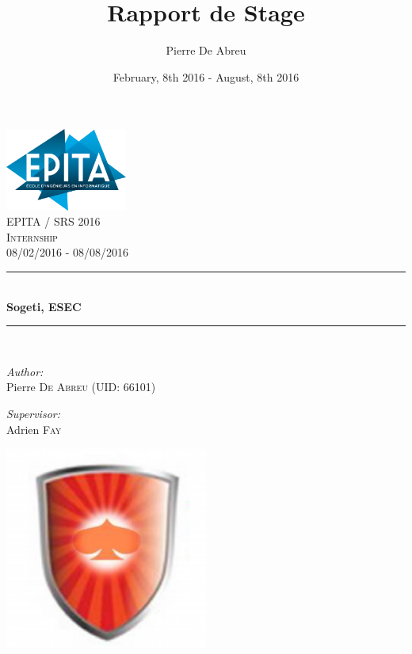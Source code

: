 \documentclass[a4paper, 12pt]{report}
\title{Rapport de Stage}
\author{Pierre De Abreu}
\date{February, 8th 2016 - August, 8th 2016}
\newcommand{\HRule}{\rule{\linewidth}{0.5mm}}
\begin{document}
\begin{titlepage}
\begin{center}

\includegraphics[width=0.3\textwidth]{images/epita.png}~\\[1cm]

\textsc{\LARGE EPITA / SRS 2016}\\[1.5cm]

\textsc{\Large  Internship}\\[0.5cm]
\textsc{\Large 08/02/2016 - 08/08/2016}

\HRule \\[0.4cm]
{ \huge \bfseries Sogeti, ESEC \\[0.4cm] }

\HRule \\[1.5cm]

\begin{minipage}{0.4\textwidth}
\begin{flushleft} \large
\emph{Author:}\\
Pierre \textsc{De Abreu (UID: 66101)}
\end{flushleft}
\end{minipage}
\begin{minipage}{0.4\textwidth}
\begin{flushright} \large
\emph{Supervisor:} \\
Adrien \textsc{Fay}
\end{flushright}
\end{minipage}

\includegraphics[width=0.5\textwidth]{images/esec.png}~\\[1cm]

\vfill

\end{center}
\end{titlepage}
\end{document}
